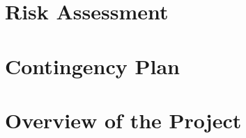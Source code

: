 \documentclass[english,runningheads,a4paper]{llncs}[2018/03/10]
\begin{document}

\section*{Risk Assessment}


\section*{Contingency Plan}


\section*{Overview of the Project}


\printbibliography
\end{document}
